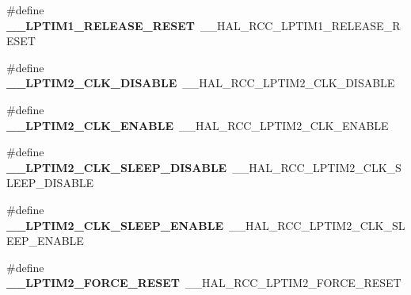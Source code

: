 \begin{DoxyCompactItemize}
\item 
\mbox{\label{group___h_a_l___r_c_c___aliased_gad894e461dd243be2f7107de7b94d5e4f}} 
\#define {\bfseries \+\_\+\+\_\+\+L\+P\+T\+I\+M1\+\_\+\+R\+E\+L\+E\+A\+S\+E\+\_\+\+R\+E\+S\+ET}~\+\_\+\+\_\+\+H\+A\+L\+\_\+\+R\+C\+C\+\_\+\+L\+P\+T\+I\+M1\+\_\+\+R\+E\+L\+E\+A\+S\+E\+\_\+\+R\+E\+S\+ET
\item 
\mbox{\label{group___h_a_l___r_c_c___aliased_gae4daf45ea16d3d30f8118ca34c8a4519}} 
\#define {\bfseries \+\_\+\+\_\+\+L\+P\+T\+I\+M2\+\_\+\+C\+L\+K\+\_\+\+D\+I\+S\+A\+B\+LE}~\+\_\+\+\_\+\+H\+A\+L\+\_\+\+R\+C\+C\+\_\+\+L\+P\+T\+I\+M2\+\_\+\+C\+L\+K\+\_\+\+D\+I\+S\+A\+B\+LE
\item 
\mbox{\label{group___h_a_l___r_c_c___aliased_gabb780b00e76662c8ea7f55b1d333ba17}} 
\#define {\bfseries \+\_\+\+\_\+\+L\+P\+T\+I\+M2\+\_\+\+C\+L\+K\+\_\+\+E\+N\+A\+B\+LE}~\+\_\+\+\_\+\+H\+A\+L\+\_\+\+R\+C\+C\+\_\+\+L\+P\+T\+I\+M2\+\_\+\+C\+L\+K\+\_\+\+E\+N\+A\+B\+LE
\item 
\mbox{\label{group___h_a_l___r_c_c___aliased_ga5521c5857e0afe9d16e1649f3099cfbb}} 
\#define {\bfseries \+\_\+\+\_\+\+L\+P\+T\+I\+M2\+\_\+\+C\+L\+K\+\_\+\+S\+L\+E\+E\+P\+\_\+\+D\+I\+S\+A\+B\+LE}~\+\_\+\+\_\+\+H\+A\+L\+\_\+\+R\+C\+C\+\_\+\+L\+P\+T\+I\+M2\+\_\+\+C\+L\+K\+\_\+\+S\+L\+E\+E\+P\+\_\+\+D\+I\+S\+A\+B\+LE
\item 
\mbox{\label{group___h_a_l___r_c_c___aliased_ga1befaabde57db93bcf04e28dffd1d468}} 
\#define {\bfseries \+\_\+\+\_\+\+L\+P\+T\+I\+M2\+\_\+\+C\+L\+K\+\_\+\+S\+L\+E\+E\+P\+\_\+\+E\+N\+A\+B\+LE}~\+\_\+\+\_\+\+H\+A\+L\+\_\+\+R\+C\+C\+\_\+\+L\+P\+T\+I\+M2\+\_\+\+C\+L\+K\+\_\+\+S\+L\+E\+E\+P\+\_\+\+E\+N\+A\+B\+LE
\item 
\mbox{\label{group___h_a_l___r_c_c___aliased_ga65872113839cb5569f584e6373e2e006}} 
\#define {\bfseries \+\_\+\+\_\+\+L\+P\+T\+I\+M2\+\_\+\+F\+O\+R\+C\+E\+\_\+\+R\+E\+S\+ET}~\+\_\+\+\_\+\+H\+A\+L\+\_\+\+R\+C\+C\+\_\+\+L\+P\+T\+I\+M2\+\_\+\+F\+O\+R\+C\+E\+\_\+\+R\+E\+S\+ET
\item 
\mbox{\label{group___h_a_l___r_c_c___aliased_gadd807afbe3725b62026e46e99531efac}} 

\end{DoxyCompactItemize}
